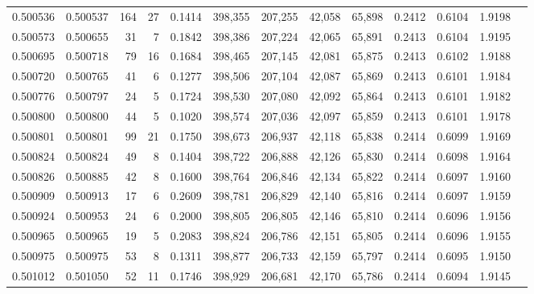 \begin{tabular}{rrrrrrrrrrrrr}
0.500536 & 0.500537 &   164 &    27 &                                     0.1414 & 398,355 & 207,255 &  42,058 &  65,898 & 0.2412 & 0.6104 & 1.9198 \\
0.500573 & 0.500655 &    31 &     7 &                                     0.1842 & 398,386 & 207,224 &  42,065 &  65,891 & 0.2413 & 0.6104 & 1.9195 \\
0.500695 & 0.500718 &    79 &    16 &                                     0.1684 & 398,465 & 207,145 &  42,081 &  65,875 & 0.2413 & 0.6102 & 1.9188 \\
0.500720 & 0.500765 &    41 &     6 &                                     0.1277 & 398,506 & 207,104 &  42,087 &  65,869 & 0.2413 & 0.6101 & 1.9184 \\
0.500776 & 0.500797 &    24 &     5 &                                     0.1724 & 398,530 & 207,080 &  42,092 &  65,864 & 0.2413 & 0.6101 & 1.9182 \\
0.500800 & 0.500800 &    44 &     5 &                                     0.1020 & 398,574 & 207,036 &  42,097 &  65,859 & 0.2413 & 0.6101 & 1.9178 \\
0.500801 & 0.500801 &    99 &    21 &                                     0.1750 & 398,673 & 206,937 &  42,118 &  65,838 & 0.2414 & 0.6099 & 1.9169 \\
0.500824 & 0.500824 &    49 &     8 &                                     0.1404 & 398,722 & 206,888 &  42,126 &  65,830 & 0.2414 & 0.6098 & 1.9164 \\
0.500826 & 0.500885 &    42 &     8 &                                     0.1600 & 398,764 & 206,846 &  42,134 &  65,822 & 0.2414 & 0.6097 & 1.9160 \\
0.500909 & 0.500913 &    17 &     6 &                                     0.2609 & 398,781 & 206,829 &  42,140 &  65,816 & 0.2414 & 0.6097 & 1.9159 \\
0.500924 & 0.500953 &    24 &     6 &                                     0.2000 & 398,805 & 206,805 &  42,146 &  65,810 & 0.2414 & 0.6096 & 1.9156 \\
0.500965 & 0.500965 &    19 &     5 &                                     0.2083 & 398,824 & 206,786 &  42,151 &  65,805 & 0.2414 & 0.6096 & 1.9155 \\
0.500975 & 0.500975 &    53 &     8 &                                     0.1311 & 398,877 & 206,733 &  42,159 &  65,797 & 0.2414 & 0.6095 & 1.9150 \\
0.501012 & 0.501050 &    52 &    11 &                                     0.1746 & 398,929 & 206,681 &  42,170 &  65,786 & 0.2414 & 0.6094 & 1.9145 \\

\end{tabular}
